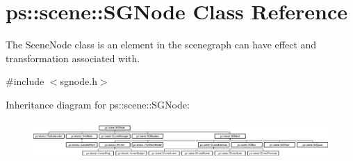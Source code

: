 \hypertarget{classps_1_1scene_1_1SGNode}{}\section{ps\+:\+:scene\+:\+:S\+G\+Node Class Reference}
\label{classps_1_1scene_1_1SGNode}


The Scene\+Node class is an element in the scenegraph can have effect and transformation associated with.  




{\ttfamily \#include $<$sgnode.\+h$>$}

Inheritance diagram for ps\+:\+:scene\+:\+:S\+G\+Node\+:\begin{figure}[H]
\begin{center}
\leavevmode
\includegraphics[height=1.447028cm]{classps_1_1scene_1_1SGNode}
\end{center}
\end{figure}
